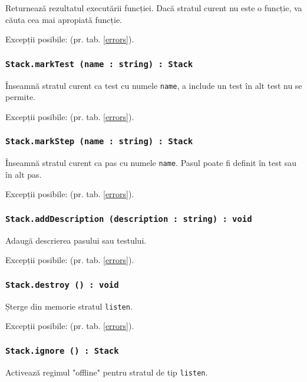 Returnează rezultatul executării funcției. Dacă stratul curent nu este o funcție, va căuta cea mai apropiată funcție.

Excepții posibile:  (pr. tab. \ref{errors}).

\subsubsection{\texttt{Stack.markTest (name : string) : Stack}}

Înseamnă stratul curent ca test cu numele \texttt{name}, a include un test în alt test nu se permite.

Excepții posibile:  (pr. tab. \ref{errors}).

\subsubsection{\texttt{Stack.markStep (name : string) : Stack}}

Înseamnă stratul curent ca pas cu numele \texttt{name}. Pasul poate fi definit în test sau în alt pas.

Excepții posibile:  (pr. tab. \ref{errors}).

\subsubsection{\texttt{Stack.addDescription (description : string) : void}}

Adaugă descrierea pasului sau testului.

Excepții posibile:  (pr. tab. \ref{errors}).

\subsubsection{\texttt{Stack.destroy () : void}}

Șterge din memorie stratul \texttt{listen}.

Excepții posibile:  (pr. tab. \ref{errors}).

\subsubsection{\texttt{Stack.ignore () : Stack}}

Activează regimul "offline" pentru stratul de tip \texttt{listen}.

